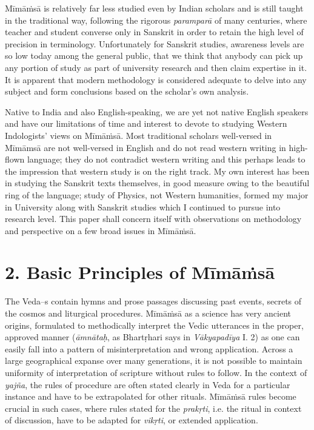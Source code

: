 Mīmāṁsā is relatively far less studied even by Indian scholars and is still taught in the traditional way, following the rigorous \textit{paramparā} of many centuries, where teacher and student converse only in Sanskrit in order to retain the high level of precision in terminology. Unfortunately for Sanskrit studies, awareness levels are so low today among the general public, that we think that anybody can pick up any portion of study as part of university research and then claim expertise in it. It is apparent that modern methodology is considered adequate to delve into any subject and form conclusions based on the scholar’s own analysis.

Native to India and also English-speaking, we are yet not native English speakers and have our limitations of time and interest to devote to studying Western Indologists’ views on Mīmāṁsā. Most traditional scholars well-versed in Mīmāmsā are not well-versed in English and do not read western writing in high-flown language; they do not contradict western writing and this perhaps leads to the impression that western study is on the right track. My own interest has been in studying the Sanskrit texts themselves, in good measure owing to the beautiful ring of the language; study of Physics, not Western humanities, formed my major in University along with Sanskrit studies which I continued to pursue into research level. This paper shall concern itself with observations on methodology and perspective on a few broad issues in Mīmāṁsā.

\vspace{-.3cm}

\section*{2. Basic Principles of Mīmāṁsā}

The Veda--s contain hymns and prose passages discussing past events, secrets of the cosmos and liturgical procedures. Mīmāṁsā as a science has very ancient origins, formulated to methodically interpret the Vedic utterances in the proper, approved manner (\textit{āmnātaḥ}, as Bhartṛhari says in \textit{Vākyapadīya} I. 2) as one can easily fall into a pattern of misinterpretation and wrong application. Across a large geographical expanse over many generations, it is not possible to maintain uniformity of interpretation of scripture without rules to follow. In the context of \textit{yajña}, the rules of procedure are often stated clearly in Veda for a particular instance and have to be extrapolated for other rituals. Mīmāṁsā rules become crucial in such cases, where rules stated for the \textit{prakṛti}, i.e. the ritual in context of discussion, have to be adapted for \textit{vikṛti}, or extended application.


